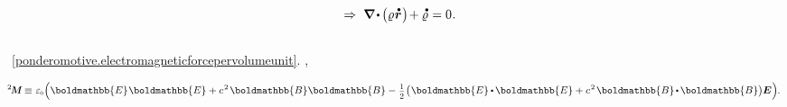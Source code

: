 \nopagebreak\vspace{-0.1em}\begin{equation}\label{continuity.balanceofelectriccharge}
\hspace*{1em}\Rightarrow\hspace{.7ex}
\boldnabla \hspace{-0.15ex} \dotp \hspace{-0.15ex} \bigl( \chargedensity \hspace{.1ex} \mathdotabove{\locationvector} \hspace{.1ex} \bigr) \hspace{-0.3ex} + \mathdotabove{\chargedensity} \hspace{.1ex} = 0
\hspace{.1ex} .
\vspace{-0.2em}\end{equation}


\subsection*{}

\en{,}
~\eqref{ponderomotive.electromagneticforcepervolumeunit}.
%
,
\href{https://en.wikipedia.org/wiki/Maxwell_stress_tensor}{}

\nopagebreak\vspace{\en{-0.1em}\ru{-0.25em}}
\begin{equation}\label{maxwellstresstensor:definition}
\maxwellstress \equiv \hspace{.12ex}
\vacuumpermittivity \hspace{-0.33ex} \left(
\boldmathbb{E} \hspace{.1ex} \boldmathbb{E} + c^{\hspace{.16ex}2} \hspace{.22ex} \boldmathbb{B} \boldmathbb{B}
- \hspace{.1ex} \smalldisplaystyleonehalf \hspace{.1ex} \bigl( \hspace{.1ex} \boldmathbb{E} \hspace{-0.1ex} \dotp \hspace{-0.15ex} \boldmathbb{E} + c^{\hspace{.16ex}2} \hspace{.22ex} \boldmathbb{B} \hspace{-0.2ex} \dotp \hspace{-0.16ex} \boldmathbb{B} \bigr) \hspace{-0.06ex} \UnitDyad \hspace{.05ex}
\right)
\hspace{-0.22em} .
\end{equation}

